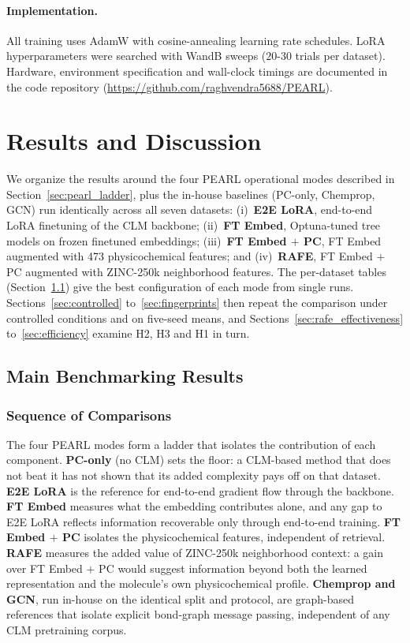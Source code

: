 \documentclass[pdflatex,sn-basic]{sn-jnl}%
\begin{document}
\paragraph{Implementation.} All training uses AdamW with cosine-annealing learning rate schedules. LoRA hyperparameters were searched with WandB sweeps ($20$-$30$ trials per dataset). Hardware, environment specification and wall-clock timings are documented in the code repository (\url{https://github.com/raghvendra5688/PEARL}).

\section{Results and Discussion}\label{sec:results_discussion}

We organize the results around the four PEARL operational modes described in Section~\ref{sec:pearl_ladder}, plus the in-house baselines (PC-only, Chemprop, GCN) run identically across all seven datasets: (i)~\textbf{E2E LoRA}, end-to-end LoRA finetuning of the CLM backbone; (ii)~\textbf{FT Embed}, Optuna-tuned tree models on frozen finetuned embeddings; (iii)~\textbf{FT Embed $+$ PC}, FT Embed augmented with 473 physicochemical features; and (iv)~\textbf{RAFE}, FT Embed $+$ PC augmented with ZINC-250k neighborhood features. The per-dataset tables (Section~\ref{sec:main_results}) give the best configuration of each mode from single runs. Sections~\ref{sec:controlled} to~\ref{sec:fingerprints} then repeat the comparison under controlled conditions and on five-seed means, and Sections~\ref{sec:rafe_effectiveness} to~\ref{sec:efficiency} examine H2, H3 and H1 in turn.

\subsection{Main Benchmarking Results}\label{sec:main_results}

\subsubsection{Sequence of Comparisons}\label{sec:comparison_sequence}
The four PEARL modes form a ladder that isolates the contribution of each component. \textbf{PC-only} (no CLM) sets the floor: a CLM-based method that does not beat it has not shown that its added complexity pays off on that dataset. \textbf{E2E LoRA} is the reference for end-to-end gradient flow through the backbone. \textbf{FT Embed} measures what the embedding contributes alone, and any gap to E2E LoRA reflects information recoverable only through end-to-end training. \textbf{FT Embed $+$ PC} isolates the physicochemical features, independent of retrieval. \textbf{RAFE} measures the added value of ZINC-250k neighborhood context: a gain over FT Embed $+$ PC would suggest information beyond both the learned representation and the molecule's own physicochemical profile. \textbf{Chemprop and GCN}, run in-house on the identical split and protocol, are graph-based references that isolate explicit bond-graph message passing, independent of any CLM pretraining corpus.
\end{document}
